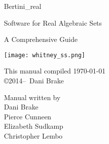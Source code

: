 \documentclass[10pt, twoside]{article}
\begin{document}
\pagestyle{front} 

	


\begin{titlepage}

	\begin{center}
	\vspace{2cm}
	{\Large Bertini\_real}

\vspace{\baselineskip}
	{\large Software for Real Algebraic Sets}



	{\large A Comprehensive Guide}	

	\vspace{3cm}
	\texttt{[image: whitney\_ss.png]}
	\end{center}

	\vfill

	\begin{minipage}{\linewidth}

	\begin{minipage}{0.4\linewidth}
	\centering
	This manual compiled \today \\
	\copyright 2014--\the\year\ Dani Brake
	\end{minipage}
	\hfill
	\begin{minipage}{0.4\linewidth}
	\centering Manual written by \vspace{\baselineskip}
	\\  Dani Brake \\ Pierce Cunneen \\ Elizabeth Sudkamp \\ Christopher Lembo
	\end{minipage}

	\end{minipage}

	

\end{titlepage}

\afterpage{\blankpage}

	\setcounter{page}{1}
\begingroup\setlength{\parskip}{0pt plus .1pt}
	\tableofcontents
	\newpage
\endgroup



\pagestyle{main} 
	\setcounter{page}{1}
\setlength{\parskip}{1em plus 0.1em minus 0.1em} %





\end{document}
